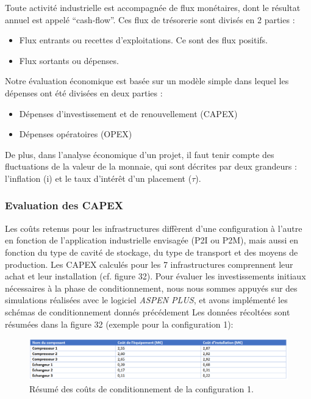 \documentclass[11pt,french,a4paper]{article}
\begin{document}
Toute activité industrielle est accompagnée de flux monétaires, dont le résultat annuel est appelé “cash-flow”. Ces flux de trésorerie sont divisés en 2 parties : 
\begin{itemize}
\item Flux entrants ou recettes d’exploitations. Ce sont des flux positifs.
\item Flux sortants ou dépenses.
\end{itemize}
Notre évaluation économique est basée sur un modèle simple dans lequel les dépenses ont été divisées en deux parties : 
\begin{itemize}
\item Dépenses d'investissement et de renouvellement (CAPEX)
\item Dépenses opératoires (OPEX)
\end{itemize}
De plus, dans l'analyse économique d'un projet, il faut tenir compte des fluctuations de la valeur de la monnaie, qui sont décrites par deux grandeurs : l'inflation (i) et le taux d'intérêt d'un placement ($\tau$). 

\subsubsection{Evaluation des CAPEX}
Les coûts retenus pour les infrastructures diffèrent d'une configuration à l'autre en fonction de l'application industrielle envisagée (P2I ou P2M), mais aussi en fonction du type de cavité de stockage, du type de transport et des moyens de production.  Les CAPEX calculés pour les 7 infrastructures comprennent leur achat et leur installation (cf. figure 32).  
Pour évaluer les investissements initiaux nécessaires à la phase de conditionnement, nous nous sommes appuyés sur des simulations réalisées avec le logiciel \emph{ASPEN PLUS}, et avons implémenté les schémas de conditionnement donnés précédement Les données récoltées sont résumées dans la figure 32 (exemple pour la configuration 1):

\begin{figure}[h!]
\centering
\includegraphics[width=0.9\linewidth]{image/chap5/Tableau 1 chap 5.png}
\caption{Résumé des coûts de conditionnement de la configuration 1. }
\end{figure}
\end{document}
